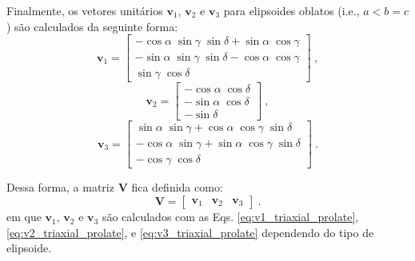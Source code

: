 Finalmente, os vetores unitários $\mathbf{v}_{1}$, $\mathbf{v}_{2}$ e $\mathbf{v}_{3}$ para elipsoides oblatos (i.e., $a < b = c$) são calculados da seguinte forma:
\begin{equation}
\mathbf{v}_{1} = \left[\begin{array}{c} 
-\cos\alpha \; \sin\gamma \; \sin\delta + \sin\alpha \; \cos\gamma \\               
-\sin\alpha \; \sin\gamma \; \sin\delta - \cos\alpha \; \cos\gamma \\ 
\sin\gamma \; \cos\delta
\end{array} \right] \: ,
\label{eq:v1_oblate}
\end{equation}
\begin{equation}
\mathbf{v}_{2} = \left[\begin{array}{c} 
-\cos\alpha \; \cos\delta \\
-\sin\alpha \; \cos\delta \\
-\sin\delta
\end{array} \right] \: ,
\label{eq:v2_oblate}
\end{equation}                   
\begin{equation}                    
\mathbf{v}_{3} = \left[\begin{array}{c} 
\sin\alpha \; \sin\gamma + \cos\alpha \; \cos\gamma \; \sin\delta \\                    
-\cos\alpha \; \sin\gamma + \sin\alpha \; \cos\gamma \; \sin\delta \\
-\cos\gamma \; \cos\delta
\end{array} \right] \: .
\label{eq:v3_oblate}
\end{equation}

Dessa forma, a matriz $\mathbf{V}$ fica definida como:
\begin{equation}
\mathbf{V} = \left[ \begin{array}{ccc}
\mathbf{v}_{1} & \mathbf{v}_{2} & \mathbf{v}_{3}
\end{array} \right] \: .
\label{eq:V_triaxial_prolate}
\end{equation}
em que $\mathbf{v}_{1}$, $\mathbf{v}_{2}$ e $\mathbf{v}_{3}$ são calculados com as Eqs.
\ref{eq:v1_triaxial_prolate}, \ref{eq:v2_triaxial_prolate}, e \ref{eq:v3_triaxial_prolate} dependendo do tipo de elipsoide.

